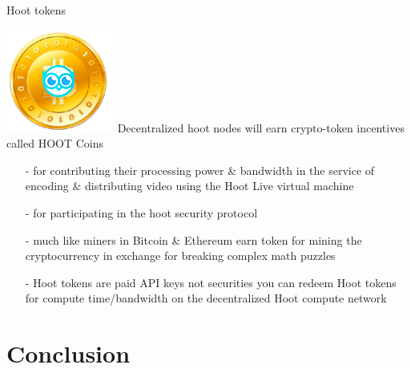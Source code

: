 \documentclass[10pt]{beamer}
\begin{document}
\begin{frame}[t]{ Hoot tokens }
    
    
\includegraphics[scale=0.4]{static/hootcoin}     Decentralized hoot nodes will earn crypto-token incentives called HOOT Coins 
    

    \begin{itemize}
    \item[-]for contributing their processing power \& bandwidth in the service of encoding \& distributing video using the Hoot Live virtual machine 
    \item[-]for participating in the hoot security protocol
    \item[-]much like miners in Bitcoin \& Ethereum earn token for mining the cryptocurrency in exchange for breaking complex math puzzles
    \item[-]Hoot tokens are paid API keys not securities you can redeem Hoot tokens for compute time/bandwidth on the decentralized Hoot compute network
    \end{itemize}
    
    
    
\end{frame}

\section{Conclusion}
\end{document}
